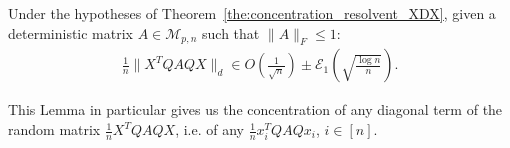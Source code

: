 \documentclass[a4papaer, titlepage]{book}
\begin{document}
\begin{lemma}\label{lem:concentration_norme_d_XQAQY}
   Under the hypotheses of Theorem~\ref{the:concentration_resolvent_XDX}, given a deterministic matrix $A \in \mathcal M_{p,n}$ such that $\|A\|_F\leq 1$:
   \begin{align*}
     \frac{1}{n}\|X^TQAQX\|_d \in O \left( \frac{1}{\sqrt n} \right) \pm \mathcal E_1 \left(\sqrt{\frac{\log n}{n}}\right).
   \end{align*}
\end{lemma}
This Lemma in particular gives us the concentration of any diagonal term of the random matrix $\frac{1}{n}X^TQAQX$, i.e. of any $\frac{1}{n}x_i^TQAQx_i$, $i\in [n]$.
\end{document}
